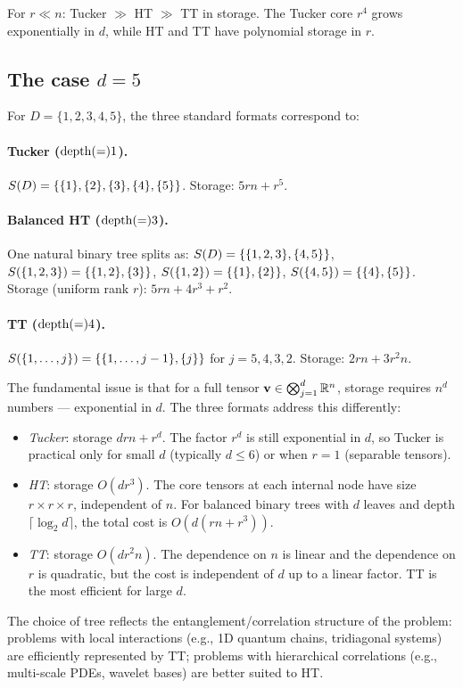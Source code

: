 For $r \ll n$: Tucker $\gg$ HT $\gg$ TT in storage. The Tucker core
$r^4$ grows exponentially in $d$, while HT and TT have polynomial
storage in $r$.

\subsection*{The case $d=5$}

\begin{example}[Three trees for $d=5$]
\label{ex:three_trees_d5}
For $D = \{1,2,3,4,5\}$, the three standard formats correspond to:

\paragraph{Tucker ($\mathrm{depth}(=) 1$).}
$S(D) = \{\{1\},\{2\},\{3\},\{4\},\{5\}\}$.
Storage: $5rn + r^5$.

\paragraph{Balanced HT ($\mathrm{depth}(=) 3$).}
One natural binary tree splits as:
$S(D) = \{\{1,2,3\},\{4,5\}\}$,
$S(\{1,2,3\}) = \{\{1,2\},\{3\}\}$,
$S(\{1,2\}) = \{\{1\},\{2\}\}$,
$S(\{4,5\}) = \{\{4\},\{5\}\}$.
Storage (uniform rank $r$): $5rn + 4r^3 + r^2$.

\paragraph{TT ($\mathrm{depth}(=) 4$).}
$S(\{1,\ldots,j\}) = \{\{1,\ldots,j-1\},\{j\}\}$ for $j = 5,4,3,2$.
Storage: $2rn + 3r^2 n$.
\end{example}

\begin{remark}
\label{rem:curse_dimensionality}
The fundamental issue is that for a full tensor $\mathbf{v} \in
\bigotimes_{j=1}^d \mathbb{R}^n$, storage requires $n^d$ numbers — exponential
in $d$. The three formats address this differently:
\begin{itemize}
\item \emph{Tucker}: storage $drn + r^d$. The factor $r^d$ is still
    exponential in $d$, so Tucker is practical only for small $d$
    (typically $d \leq 6$) or when $r = 1$ (separable tensors).
\item \emph{HT}: storage $O(dr^3)$. The core tensors at each internal
    node have size $r \times r \times r$, independent of $n$. For
    balanced binary trees with $d$ leaves and depth $\lceil\log_2 d\rceil$,
    the total cost is $O(d(rn + r^3))$.
\item \emph{TT}: storage $O(dr^2 n)$. The dependence on $n$ is linear
    and the dependence on $r$ is quadratic, but the cost is independent
    of $d$ up to a linear factor. TT is the most efficient for large $d$.
\end{itemize}
The choice of tree reflects the entanglement/correlation structure of
the problem: problems with local interactions (e.g., 1D quantum chains,
tridiagonal systems) are efficiently represented by TT; problems with
hierarchical correlations (e.g., multi-scale PDEs, wavelet bases) are
better suited to HT.
\end{remark}

